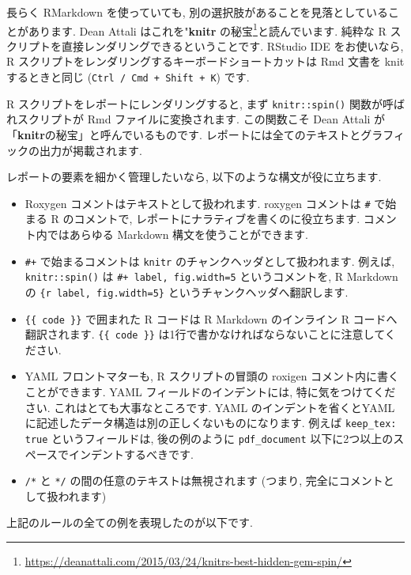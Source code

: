 \documentclass[
  11pt,
  lualatex,ja=standard,jafont=noto]{bxjsreport}
\renewcommand{\href}[2]{#2\footnote{\url{#1}}}
\begin{document}
長らく RMarkdown を使っていても, 別の選択肢があることを見落としていることがあります. Dean Attali はこれを\href{https://deanattali.com/2015/03/24/knitrs-best-hidden-gem-spin/}{"\textbf{knitr} の秘宝}と読んでいます. 純粋な R スクリプトを直接レンダリングできるということです. RStudio IDE をお使いなら, R スクリプトをレンダリングするキーボードショートカットは Rmd 文書を knit するときと同じ (\texttt{Ctrl / Cmd + Shift + K}) です.

R スクリプトをレポートにレンダリングすると, まず \texttt{knitr::spin()} 関数が呼ばれスクリプトが Rmd ファイルに変換されます. この関数こそ Dean Attali が「\textbf{knitr}の秘宝」と呼んでいるものです. レポートには全てのテキストとグラフィックの出力が掲載されます.

レポートの要素を細かく管理したいなら, 以下のような構文が役に立ちます.

\begin{itemize}
\item
  Roxygen コメントはテキストとして扱われます. roxygen コメントは \texttt{\#\textquotesingle{}} で始まる R のコメントで, レポートにナラティブを書くのに役立ちます. コメント内ではあらゆる Markdown 構文を使うことができます.
\item
  \texttt{\#+} で始まるコメントは \texttt{knitr} のチャンクヘッダとして扱われます. 例えば, \texttt{knitr::spin()} は \texttt{\#+ label, fig.width=5} というコメントを, R Markdown の \texttt{\textasciigrave{}\textasciigrave{}\textasciigrave{}\{r\ label,\ fig.width=5\}} というチャンクヘッダへ翻訳します.
\item
  \texttt{\{\{ code \}\}} で囲まれた R コードは R Markdown のインライン R コードへ翻訳されます. \texttt{\{\{ code \}\}} は1行で書かなければならないことに注意してください.
\item
  YAML フロントマターも, R スクリプトの冒頭の roxigen コメント内に書くことができます. YAML フィールドのインデントには, 特に気をつけてください. これはとても大事なところです. YAML のインデントを省くとYAMLに記述したデータ構造は別の正しくないものになります. 例えば \texttt{keep\_tex: true} というフィールドは, 後の例のように \texttt{pdf\_document} 以下に2つ以上のスペースでインデントするべきです.
\item
  \texttt{/*} と \texttt{*/} の間の任意のテキストは無視されます (つまり, 完全にコメントとして扱われます)
\end{itemize}

上記のルールの全ての例を表現したのが以下です.
\end{document}
